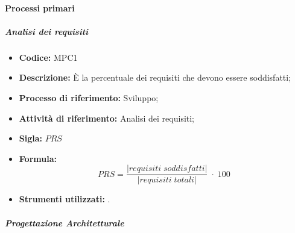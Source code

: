 \paragraph{Processi primari}
\subparagraph{Analisi dei requisiti}
    \begin{itemize}
        \item \textbf{Codice:} MPC1
        \item \textbf{Descrizione:} È la percentuale dei requisiti che devono essere soddisfatti;
        \item \textbf{Processo di riferimento:} Sviluppo;
        \item \textbf{Attività di riferimento:} Analisi dei requisiti;
        \item \textbf{Sigla:} $PRS$
        \item \textbf{Formula:} $$PRS = {\frac{|requisiti \; soddisfatti|}{|requisiti \; totali|}}\; \cdot \; 100$$
        \item \textbf{Strumenti utilizzati:} .
    \end{itemize}
\subparagraph{Progettazione Architetturale}
